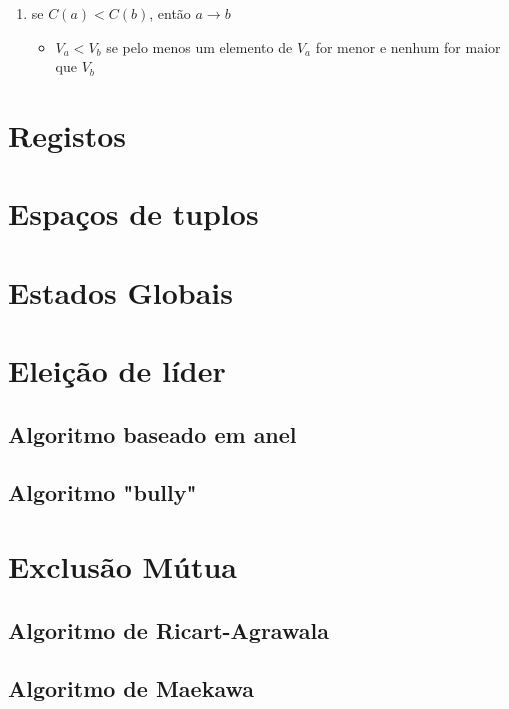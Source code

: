 \documentclass[12pt]{article}
\begin{document}
\begin{enumerate}
    \item se $C(a) < C(b)$, então $a \rightarrow b$
    \begin{itemize}[topsep=0pt]
        \item $V_a < V_b$ se pelo menos um elemento de $V_a$ for menor e nenhum for maior que $V_b$
    \end{itemize}
\end{enumerate}

\section{Registos}

\section{Espaços de tuplos}

\newpage

\section{Estados Globais}

\newpage

\section{Eleição de líder}

\subsection{Algoritmo baseado em anel}

\subsection{Algoritmo "bully"}

\section{Exclusão Mútua}

\subsection{Algoritmo de Ricart-Agrawala}

\subsection{Algoritmo de Maekawa}
\end{document}
